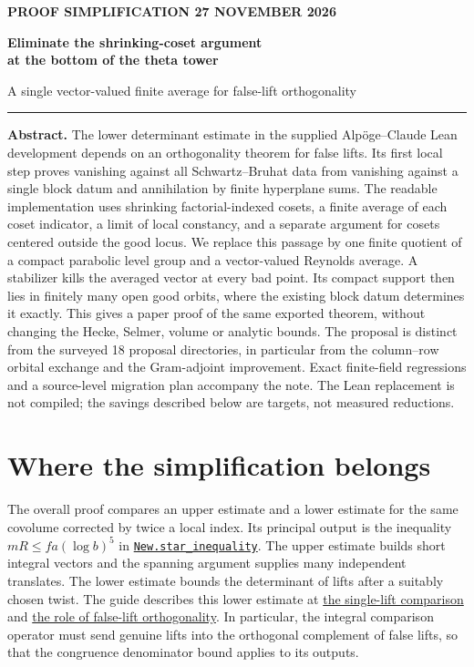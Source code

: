 \documentclass[11pt,letterpaper]{article}
\newcommand{\baseurl}{https://github.com/VladimirReshetnikov/ProveIt/blob/9050b04000647d588d0c78d945180abcd3b0bcf7/Analysis/GeneralizedRiemannHypothesis/}
\newcommand{\src}[3]{\href{\baseurl Lean/grh/src/#1.lean\#L#2}{#3}}
\newcommand{\guide}[2]{\href{\baseurl docs/guide/theta_lifts_and_dirichlet_zeros.tex\#L#1}{#2}}
\begin{document}
\thispagestyle{plain}
{\small\sffamily\color{accent}\bfseries PROOF SIMPLIFICATION \hfill 27 NOVEMBER 2026}\par\vspace{.15in}
{\LARGE\bfseries\color{ink} Eliminate the shrinking-coset argument\\ at the bottom of the theta tower}\par\vspace{.08in}
{\large A single vector-valued finite average for false-lift orthogonality}\par\vspace{.16in}
\hrule\vspace{.12in}
\textbf{Abstract.} The lower determinant estimate in the supplied Alp\"oge--Claude Lean development depends on an orthogonality theorem for false lifts. Its first local step proves vanishing against all Schwartz--Bruhat data from vanishing against a single block datum and annihilation by finite hyperplane sums. The readable implementation uses shrinking factorial-indexed cosets, a finite average of each coset indicator, a limit of local constancy, and a separate argument for cosets centered outside the good locus. We replace this passage by one finite quotient of a compact parabolic level group and a vector-valued Reynolds average. A stabilizer kills the averaged vector at every bad point. Its compact support then lies in finitely many open good orbits, where the existing block datum determines it exactly. This gives a paper proof of the same exported theorem, without changing the Hecke, Selmer, volume or analytic bounds. The proposal is distinct from the surveyed 18 proposal directories, in particular from the column--row orbital exchange and the Gram-adjoint improvement. Exact finite-field regressions and a source-level migration plan accompany the note. The Lean replacement is not compiled; the savings described below are targets, not measured reductions.

\section{Where the simplification belongs}
The overall proof compares an upper estimate and a lower estimate for the same covolume corrected by twice a local index. Its principal output is the inequality \(mR\le fa(\log b)^5\) in \src{New/Reduction/MainInequality}{75}{\texttt{New.star\_inequality}}. The upper estimate builds short integral vectors and the spanning argument supplies many independent translates. The lower estimate bounds the determinant of lifts after a suitably chosen twist. The guide describes this lower estimate at \guide{1028}{the single-lift comparison} and \guide{1204}{the role of false-lift orthogonality}. In particular, the integral comparison operator must send genuine lifts into the orthogonal complement of false lifts, so that the congruence denominator bound applies to its outputs.
\end{document}
